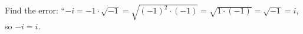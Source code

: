 Find the error: ``$-i=-1\cdot\sqrt{-1}=\sqrt{(-1)^2\cdot(-1)}=\sqrt{1\cdot(-1)}=\sqrt{-1}=i$, so $-i=i$.
